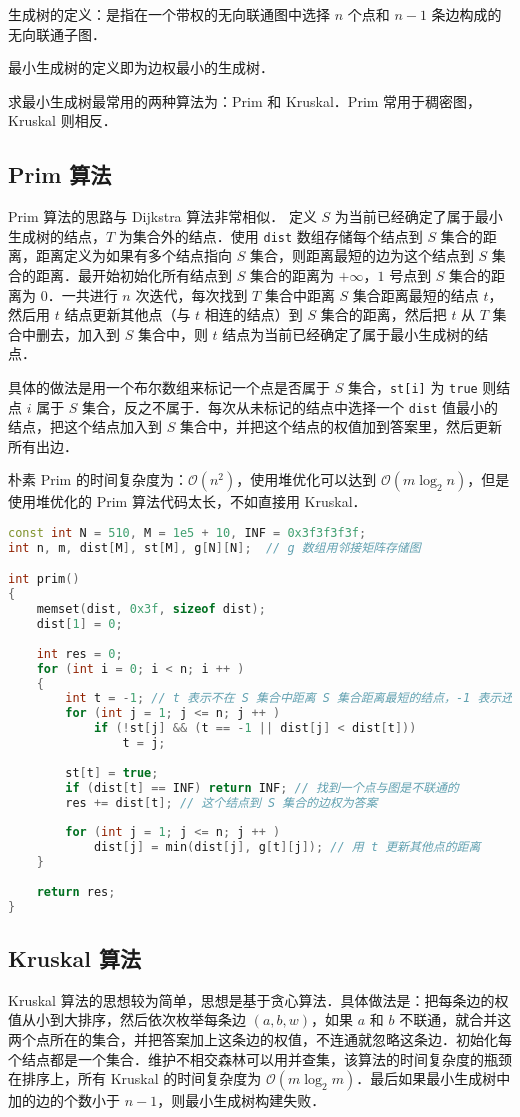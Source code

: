 
\begin{issues}
\issueMissDepend
\issueDraft
\end{issues}

生成树的定义：是指在一个带权的无向联通图中选择 $n$ 个点和 $n - 1$ 条边构成的无向联通子图．

最小生成树的定义即为边权最小的生成树．

求最小生成树最常用的两种算法为：Prim 和 Kruskal．Prim 常用于稠密图，Kruskal 则相反．

\subsection{Prim 算法}

Prim 算法的思路与 Dijkstra 算法非常相似．
定义 $S$ 为当前已经确定了属于最小生成树的结点，$T$ 为集合外的结点．使用 \verb|dist| 数组存储每个结点到 $S$ 集合的距离，距离定义为如果有多个结点指向 $S$ 集合，则距离最短的边为这个结点到 $S$ 集合的距离．最开始初始化所有结点到 $S$ 集合的距离为 $+\infty$，$1$ 号点到 $S$ 集合的距离为 $0$．一共进行 $n$ 次迭代，每次找到 $T$ 集合中距离 $S$ 集合距离最短的结点 $t$，然后用 $t$ 结点更新其他点（与 $t$ 相连的结点）到 $S$ 集合的距离，然后把 $t$ 从 $T$ 集合中删去，加入到 $S$ 集合中，则 $t$ 结点为当前已经确定了属于最小生成树的结点．

具体的做法是用一个布尔数组来标记一个点是否属于 $S$ 集合，\verb|st[i]| 为 \verb|true| 则结点 $i$ 属于 $S$ 集合，反之不属于．每次从未标记的结点中选择一个 \verb|dist| 值最小的结点，把这个结点加入到 $S$ 集合中，并把这个结点的权值加到答案里，然后更新所有出边．

朴素 Prim 的时间复杂度为：$\mathcal{O}(n^2)$，使用堆优化可以达到 $\mathcal{O}(m \log_2 n)$，但是使用堆优化的 Prim 算法代码太长，不如直接用 Kruskal．

\begin{lstlisting}[language=cpp]
const int N = 510, M = 1e5 + 10, INF = 0x3f3f3f3f;
int n, m, dist[M], st[M], g[N][N];  // g 数组用邻接矩阵存储图

int prim()
{
    memset(dist, 0x3f, sizeof dist);
    dist[1] = 0;
    
    int res = 0;
    for (int i = 0; i < n; i ++ )
    {
        int t = -1; // t 表示不在 S 集合中距离 S 集合距离最短的结点，-1 表示还没找到
        for (int j = 1; j <= n; j ++ )
            if (!st[j] && (t == -1 || dist[j] < dist[t]))  
                t = j;  
        
        st[t] = true;
        if (dist[t] == INF) return INF; // 找到一个点与图是不联通的
        res += dist[t]; // 这个结点到 S 集合的边权为答案
        
        for (int j = 1; j <= n; j ++ )
            dist[j] = min(dist[j], g[t][j]); // 用 t 更新其他点的距离
    }
     
    return res;
}
\end{lstlisting}

\subsection{Kruskal 算法}

Kruskal 算法的思想较为简单，思想是基于贪心算法．具体做法是：把每条边的权值从小到大排序，然后依次枚举每条边 $(a,b,w)$，如果 $a$ 和 $b$ 不联通，就合并这两个点所在的集合，并把答案加上这条边的权值，不连通就忽略这条边．初始化每个结点都是一个集合．维护不相交森林可以用并查集，该算法的时间复杂度的瓶颈在排序上，所有 Kruskal 的时间复杂度为 $\mathcal{O}(m \log_2 m)$．最后如果最小生成树中加的边的个数小于 $n - 1$，则最小生成树构建失败．